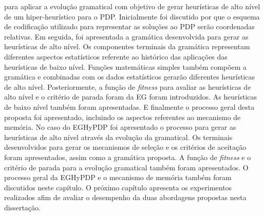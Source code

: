  para aplicar a evolução gramatical com objetivo de gerar heurísticas de alto nível de um  hiper-heurístico para o PDP. Inicialmente foi discutido por que o esquema de codificação utilizado para representar as soluções ao PDP serão coordenadas relativas. Em seguida, foi apresentada a gramática desenvolvida para gerar as heurísticas de alto nível. Os componentes terminais da gramática representam diferentes aspectos estatísticos referente ao histórico das aplicações das heurísticas de baixo nível. Funções matemáticas simples também compõem a gramática e combinadas com os dados estatísticos gerarão diferentes heurísticas de alto nível. Posteriormente, a função de \textit{fitness} para avaliar as heurísticas de alto nível e o critério de parada foram da EG foram introduzidos. As heurísticas de baixo nível também foram apresentadas. E finalmente o processo geral desta proposta foi apresentado, incluindo os aspectos referentes ao mecanismo de memória. No caso do EGHyPDP foi apresentado o processo para gerar as heurísticas de alto nível através da evolução da gramatical. Os terminais desenvolvidos para gerar os mecanismos de seleção e os critérios de aceitação foram apresentados, assim como a gramática proposta. A função de \textit{fitness} e o critério de parada para a evolução gramatical também foram apresentados. O processo geral da EGHyPDP e o mecanismo de memória também foram discutidos neste capítulo. O próximo capítulo apresenta os experimentos realizados afim de avaliar o desempenho da duas abordagens propostas nesta dissertação.



